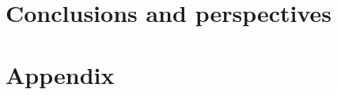 \documentclass{report}
\begin{document}
\chapter{Conclusions and perspectives}
\label{chap:conclusion}
\minitoc
\pagebreak
% 

\chapter*{Appendix} %
\label{chap:appendix}
\renewcommand{\thefigure}{A\arabic{figure}} %
% 

\newpage
\listoffigures
{} %

\listoftables
{} %

\newpage
\end{document}
